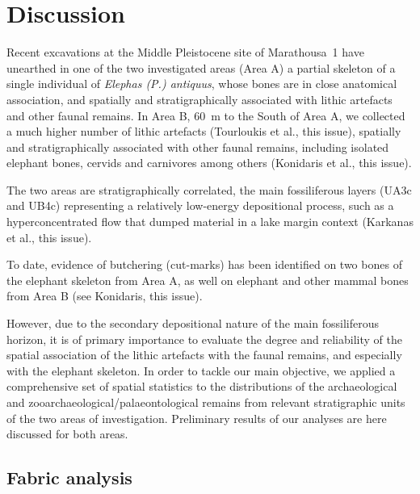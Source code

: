 \documentclass[preprint,authoryear,times]{elsarticle} %
\begin{document}
\section{Discussion}

Recent excavations at the Middle Pleistocene site of Marathousa~1 have unearthed in one of the two investigated areas (Area A) a partial skeleton of a single individual of \emph{Elephas (P.) antiquus}, whose bones are in close anatomical association, and spatially and stratigraphically associated with lithic artefacts and other faunal remains. In Area B, 60~m to the South of Area A, we collected a much higher number of lithic artefacts (Tourloukis et al., this issue), spatially and stratigraphically associated with other faunal remains, including isolated elephant bones, cervids and carnivores among others (Konidaris et al., this issue).

The two areas are stratigraphically correlated, the main fossiliferous layers (UA3c and UB4c) representing a relatively low-energy depositional process, such as a hyperconcentrated flow that dumped material in a lake margin context (Karkanas et al., this issue).

To date, evidence of butchering (cut-marks) has been identified on two bones of the elephant skeleton from Area A, as well on elephant and other mammal bones from Area B (see Konidaris, this issue).

However, due to the secondary depositional nature of the main fossiliferous horizon, it is of primary importance to evaluate the degree and reliability of the spatial association of the lithic artefacts with the faunal remains, and especially with the elephant skeleton. In order to tackle our main objective, we applied a comprehensive set of spatial statistics to the distributions of the archaeological and zooarchaeological/palaeontological remains from relevant stratigraphic units of the two areas of investigation. Preliminary results of our analyses are here discussed for both areas.

\subsection{Fabric analysis}


\end{document}
